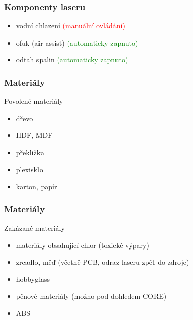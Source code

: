 \documentclass[14pt]{beamer}
\begin{document}
\begin{frame}
\frametitle{Komponenty laseru}
\begin{itemize}
	
	\item vodní chlazení \textcolor{red}{(manuální ovládání)}
	\item ofuk (air assist) \textcolor{green}{(automaticky zapnuto)}
	\item odtah spalin \textcolor{green}{(automaticky zapnuto)}
	
\end{itemize}
\end{frame}








\begin{frame}
\frametitle{Materiály}


\begin{examples}{Povolené materiály}
	\begin{itemize}
		\item dřevo
		\item HDF, MDF
		\item překližka
		\item plexisklo
		\item karton, papír
	\end{itemize}
\end{examples}




\end{frame}

\begin{frame}
\frametitle{Materiály}

\begin{alertblock}{Zakázané materiály}
	\begin{itemize}
		\item materiály obsahující chlor (toxické výpary)
		\item zrcadlo, měď (včetně PCB, odraz laseru zpět do zdroje)
		\item hobbyglass
		\item pěnové materiály (možno pod dohledem CORE)
		\item ABS
	\end{itemize}
\end{alertblock}

\end{frame}
\end{document}
